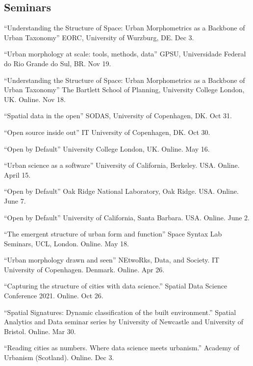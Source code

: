 \documentclass[12pt,a4paper]{report}
\begin{document}
    \subsection*{Seminars}

    \begin{tablist}

        \item[2025] \tab{}\enquote{Understanding the Structure of Space: Urban Morphometrics as a Backbone of Urban Taxonomy} EORC, University of Wurzburg, DE. Dec 3.
        \item[2025] \tab{}\enquote{Urban morphology at scale: tools, methods, data} GPSU, Universidade Federal do Rio Grande do Sul, BR. Nov 19.
        \item[2025] \tab{}\enquote{Understanding the Structure of Space: Urban Morphometrics as a Backbone of Urban Taxonomy} The Bartlett School of Planning, University College London, UK. Online. Nov 18.
        \item[2025] \tab{}\enquote{Spatial data in the open} SODAS, University of Copenhagen, DK. Oct 31.
        \item[2025] \tab{}\enquote{Open source inside out} IT University of Copenhagen, DK. Oct 30.
        \item[2025] \tab{}\enquote{Open by Default} University College London, UK. Online. May 16.
        \item[2025] \tab{}\enquote{Urban science as a software} University of California, Berkeley. USA. Online. April 15.
        \item[2023] \tab{}\enquote{Open by Default} Oak Ridge National Laboratory, Oak Ridge. USA. Online. June 7.
        \item[2023] \tab{}\enquote{Open by Default} University of California, Santa Barbara. USA. Online. June 2.
        \item[2023] \tab{}\enquote{The emergent structure of urban form and function} Space Syntax Lab Seminars, UCL, London. Online. May 18.
        \item[2023] \tab{}\enquote{Urban morphology drawn and seen} NEtwoRks, Data, and Society. IT University of Copenhagen. Denmark. Online. Apr 26.
        \item[2021] \tab{}\enquote{Capturing the structure of cities with data science.} Spatial Data Science Conference 2021. Online. Oct 26.
        \item[2021] \tab{}\enquote{Spatial Signatures: Dynamic classification of the built environment.} Spatial Analytics and Data seminar series by University of Newcastle and University of Bristol. Online. Mar 30.
        \item[2020] \tab{}\enquote{Reading cities as numbers. Where data science meets urbanism.} Academy of Urbanism (Scotland). Online. Dec 3.

    \end{tablist}
\end{document}
